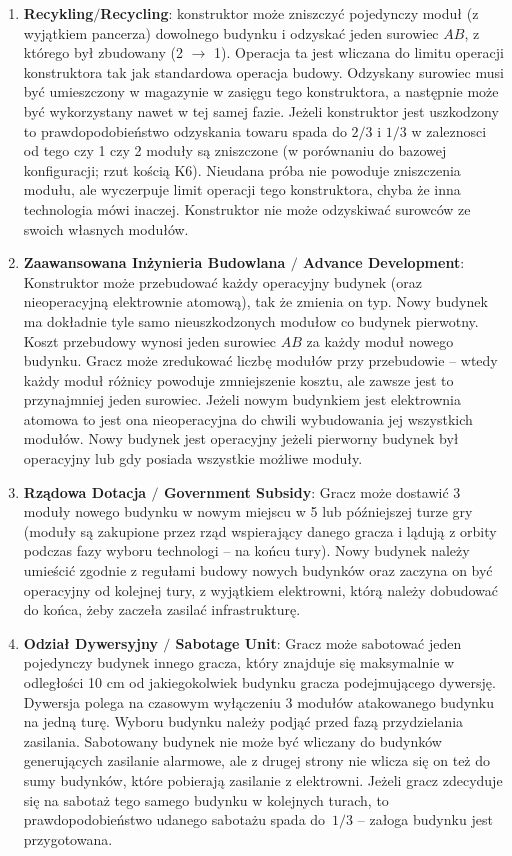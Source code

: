\documentclass[11pt,a4paper]{article}
\begin{document}
\begin{enumerate}
\item \textbf{Recykling$/$Recycling}: konstruktor może zniszczyć pojedynczy moduł (z wyjątkiem pancerza) dowolnego budynku i odzyskać jeden surowiec $AB$, z którego był zbudowany (2 $\to$ 1). Operacja ta jest wliczana do limitu operacji konstruktora tak jak standardowa operacja budowy. Odzyskany surowiec musi być umieszczony w magazynie w zasięgu tego konstruktora, a następnie może być wykorzystany nawet w tej samej fazie. Jeżeli konstruktor jest uszkodzony to prawdopodobieństwo odzyskania towaru spada do $2/3$ i $1/3$ w zaleznosci od tego czy 1 czy 2 moduły są zniszczone (w porównaniu do bazowej konfiguracji; rzut kością K6). Nieudana próba nie powoduje zniszczenia modułu, ale wyczerpuje limit operacji tego konstruktora, chyba że inna technologia mówi inaczej. Konstruktor nie może odzyskiwać surowców ze swoich własnych modułów.
\item \textbf{Zaawansowana Inżynieria Budowlana $/$ Advance Development}: Konstruktor może przebudować każdy operacyjny budynek (oraz nieoperacyjną elektrownie atomową), tak że zmienia on typ. Nowy budynek ma dokładnie tyle samo nieuszkodzonych modułow co budynek pierwotny. Koszt przebudowy wynosi jeden surowiec $AB$ za każdy moduł nowego budynku. Gracz może zredukować liczbę modułów przy przebudowie -- wtedy każdy moduł różnicy powoduje zmniejszenie kosztu, ale zawsze jest to przynajmniej jeden surowiec. Jeżeli nowym budynkiem jest elektrownia atomowa to jest ona nieoperacyjna do chwili wybudowania jej wszystkich modułów. Nowy budynek jest operacyjny jeżeli pierworny budynek był operacyjny lub gdy posiada wszystkie możliwe moduły.
\item \textbf{Rządowa Dotacja $/$ Government Subsidy}: Gracz może dostawić 3 moduły nowego budynku w nowym miejscu w 5 lub późniejszej turze gry (moduły są zakupione przez rząd wspierający danego gracza i lądują z orbity podczas fazy wyboru technologi -- na końcu tury). Nowy budynek należy umieścić zgodnie z regułami budowy nowych budynków oraz zaczyna on być operacyjny od kolejnej tury, z wyjątkiem elektrowni, którą należy dobudować do końca, żeby zaczeła zasilać infrastrukturę.
\item \textbf{Odział Dywersyjny $/$ Sabotage Unit}: Gracz może sabotować jeden pojedynczy budynek innego gracza, który znajduje się maksymalnie w odległości 10 cm od jakiegokolwiek budynku gracza podejmującego dywersję. Dywersja polega na czasowym wyłączeniu 3 modułów atakowanego budynku na jedną turę. Wyboru budynku należy podjąć przed fazą przydzielania zasilania. Sabotowany budynek nie może być wliczany do budynków generujących zasilanie alarmowe, ale z drugej strony nie wlicza się on też do sumy budynków, które pobierają zasilanie z elektrowni. Jeżeli gracz zdecyduje się na sabotaż tego samego budynku w kolejnych turach, to prawdopodobieństwo udanego sabotażu spada do~$1/3$ -- załoga budynku jest przygotowana.

\end{enumerate}
\end{document}
